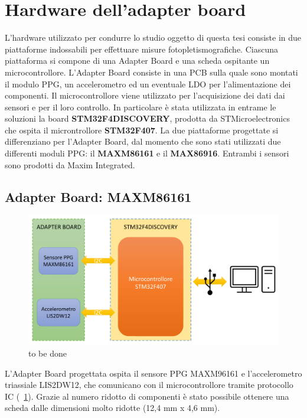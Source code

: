 \section{Hardware dell'adapter board}
L'hardware utilizzato per condurre lo studio oggetto di questa tesi consiste in due piattaforme indossabili per effettuare misure fotopletismografiche. Ciascuna piattaforma si compone di una Adapter Board e una scheda ospitante un microcontrollore. L'Adapter Board consiste in una PCB sulla quale sono montati il modulo PPG, un accelerometro ed un eventuale LDO per l'alimentazione dei componenti. Il microcontrollore viene utilizzato per l'acquisizione dei dati dai sensori e per il loro controllo. In particolare è stata utilizzata in entrame le soluzioni la board \textbf{STM32F4DISCOVERY}, prodotta da STMicroelectronics che ospita il microntrollore \textbf{STM32F407}.
La due piattaforme progettate si differenziano per l'Adapter Board, dal momento che sono stati utilizzati due differenti moduli PPG: il \textbf{MAXM86161} e il \textbf{MAX86916}. Entrambi i sensori sono prodotti da Maxim Integrated.
\subsection{Adapter Board: MAXM86161}
\begin{figure}[b]
	\centering
	\includegraphics[width=0.6\linewidth]{ImageFiles/Hardware/DiagrammaBlocchiMAXM86161}
	\caption{to be done}
	\label{fig:DiagrammaBlocchiMAXM86161}
\end{figure}
L'Adapter Board progettata ospita il sensore PPG MAXM96161 e l'accelerometro triassiale LIS2DW12, che comunicano con il microcontrollore tramite protocollo IC (\Fig~\ref{fig:DiagrammaBlocchiMAXM86161}). Grazie al numero ridotto di componenti è stato possibile ottenere una scheda dalle dimensioni molto ridotte (12,4 mm x 4,6 mm).

